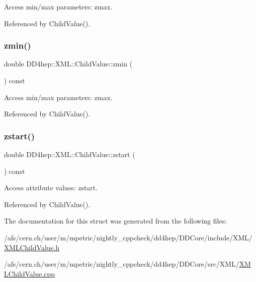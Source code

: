 Access min/max parameters\+: zmax. 



Referenced by Child\+Value().

\hypertarget{struct_d_d4hep_1_1_x_m_l_1_1_child_value_a2dcf57fce252cf96bdd7bc3372039a02}{}\label{struct_d_d4hep_1_1_x_m_l_1_1_child_value_a2dcf57fce252cf96bdd7bc3372039a02} 
\subsubsection{\texorpdfstring{zmin()}{zmin()}}
{\footnotesize\ttfamily double D\+D4hep\+::\+X\+M\+L\+::\+Child\+Value\+::zmin (\begin{DoxyParamCaption}{ }\end{DoxyParamCaption}) const}



Access min/max parameters\+: zmax. 



Referenced by Child\+Value().

\hypertarget{struct_d_d4hep_1_1_x_m_l_1_1_child_value_aa6843ea2c74b71d588f89257d971f344}{}\label{struct_d_d4hep_1_1_x_m_l_1_1_child_value_aa6843ea2c74b71d588f89257d971f344} 
\subsubsection{\texorpdfstring{zstart()}{zstart()}}
{\footnotesize\ttfamily double D\+D4hep\+::\+X\+M\+L\+::\+Child\+Value\+::zstart (\begin{DoxyParamCaption}{ }\end{DoxyParamCaption}) const}



Access attribute values\+: zstart. 



Referenced by Child\+Value().



The documentation for this struct was generated from the following files\+:\begin{DoxyCompactItemize}
\item 
/afs/cern.\+ch/user/m/mpetric/nightly\+\_\+cppcheck/dd4hep/\+D\+D\+Core/include/\+X\+M\+L/\hyperlink{_x_m_l_child_value_8h}{X\+M\+L\+Child\+Value.\+h}\item 
/afs/cern.\+ch/user/m/mpetric/nightly\+\_\+cppcheck/dd4hep/\+D\+D\+Core/src/\+X\+M\+L/\hyperlink{_x_m_l_child_value_8cpp}{X\+M\+L\+Child\+Value.\+cpp}\end{DoxyCompactItemize}
